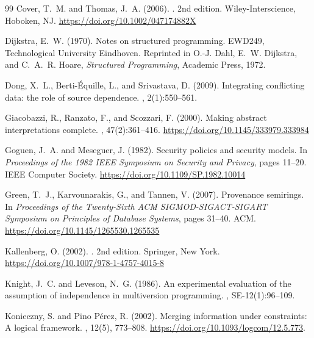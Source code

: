 \documentclass[11pt]{article}
\theoremstyle{definition}
\begin{document}
\begin{thebibliography}{99}
Cover, T.~M. and Thomas, J.~A. (2006).
.
\newblock 2nd edition. Wiley-Interscience, Hoboken, NJ.
\newblock \url{https://doi.org/10.1002/047174882X}

Dijkstra, E.~W. (1970).
\newblock Notes on structured programming.
\newblock EWD249, Technological University Eindhoven.
\newblock Reprinted in O.-J. Dahl, E.~W. Dijkstra, and C.~A.~R. Hoare,
  {\em Structured Programming}, Academic Press, 1972.

Dong, X.~L., Berti-\'Equille, L., and Srivastava, D. (2009).
\newblock Integrating conflicting data: the role of source dependence.
, 2(1):550--561.

Giacobazzi, R., Ranzato, F., and Scozzari, F. (2000).
\newblock Making abstract interpretations complete.
, 47(2):361--416.
\newblock \url{https://doi.org/10.1145/333979.333984}

Goguen, J.~A. and Meseguer, J. (1982).
\newblock Security policies and security models.
\newblock In {\em Proceedings of the 1982 IEEE Symposium on Security and
  Privacy}, pages 11--20. IEEE Computer Society.
\newblock \url{https://doi.org/10.1109/SP.1982.10014}

Green, T.~J., Karvounarakis, G., and Tannen, V. (2007).
\newblock Provenance semirings.
\newblock In {\em Proceedings of the Twenty-Sixth ACM SIGMOD-SIGACT-SIGART Symposium on Principles of Database Systems}, pages 31--40. ACM.
\newblock \url{https://doi.org/10.1145/1265530.1265535}

Kallenberg, O. (2002).
.
\newblock 2nd edition. Springer, New York.
\newblock \url{https://doi.org/10.1007/978-1-4757-4015-8}

Knight, J.~C. and Leveson, N.~G. (1986).
\newblock An experimental evaluation of the assumption of independence in multiversion programming.
, SE-12(1):96--109.

Konieczny, S. and Pino P\'erez, R. (2002).
\newblock Merging information under constraints: A logical framework.
, 12(5), 773--808.
\newblock \url{https://doi.org/10.1093/logcom/12.5.773}.


\end{thebibliography}
\end{document}
